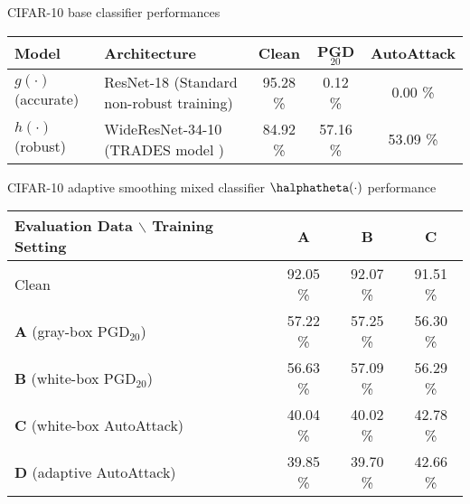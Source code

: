 \documentclass[11pt, letterpaper]{article}
\theoremstyle{plain}
\theoremstyle{definition}
\begin{document}
\begin{table}[!tb]
	\centering
	\vspace{-2mm}
	\label{tab:cifar10}
	\vspace{-.5mm}
	\begin{small}
		CIFAR-10 base classifier performances \\
		\begin{tabular}{l|l!{\vrule width 2pt}c|c|c}
			\toprule
			Model & \footnotesize{Architecture} & Clean & PGD$_{20}$ & AutoAttack \\
			\midrule
			$g (\cdot)$ \scriptsize{(accurate)} & ResNet-18 \scriptsize{(Standard non-robust training)} & 95.28 \% & 0.12 \% & 0.00 \% \\
			$h (\cdot)$ \scriptsize{(robust)} & WideResNet-34-10 \scriptsize{(TRADES model \citep{Zhang19})} & 84.92 \% & 57.16 \% & 53.09 \% \\
			\bottomrule
		\end{tabular}
		
		\vspace{1.5mm}
		CIFAR-10 adaptive smoothing mixed classifier $\halphatheta (\cdot)$ performance \\
		\begin{tabular}{l!{\vrule width 2pt}c|c|c}
			\toprule
			Evaluation Data $\backslash$ Training Setting & \textbf{A} & \textbf{B} & \textbf{C} \\
			\midrule
			Clean 								   		   & 92.05 \% & 92.07 \% & 91.51 \% \\
			\textbf{A} \scriptsize{(gray-box PGD$_{20}$)}  & 57.22 \% & 57.25 \% & 56.30 \% \\
			\textbf{B} \scriptsize{(white-box PGD$_{20}$)} & 56.63 \% & 57.09 \% & 56.29 \% \\
			\textbf{C} \scriptsize{(white-box AutoAttack)} & 40.04 \% & 40.02 \% & 42.78 \% \\
			\textbf{D} \scriptsize{(adaptive AutoAttack)}  & 39.85 \% & 39.70 \% & 42.66 \% \\
			\bottomrule
		\end{tabular}
	\end{small}
	\vspace{-1mm}
\end{table}
\end{document}
